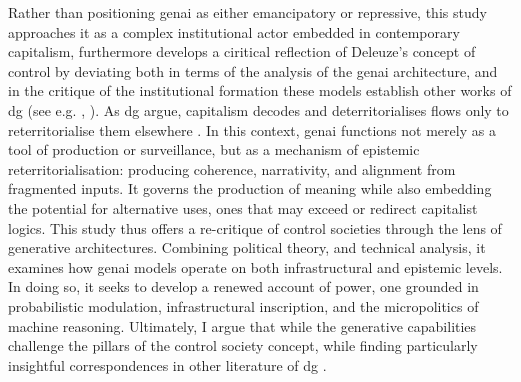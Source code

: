 Rather than positioning \gls{genai} as either emancipatory or repressive, this study approaches it as a complex institutional actor embedded in contemporary capitalism, furthermore develops a ciritical reflection of Deleuze's concept of control by deviating both in terms of the analysis of the \gls{genai} architecture, and in the critique of the institutional formation these models establish other works of \gls{dg}  (see e.g. \cite{deleuze1983}, \cite{deleuze1987}). As \gls{dg} argue, capitalism decodes and deterritorialises flows only to reterritorialise them elsewhere \parencite{deleuze1983}. In this context, \gls{genai} functions not merely as a tool of production or surveillance, but as a mechanism of epistemic reterritorialisation: producing coherence, narrativity, and alignment from fragmented inputs. It governs the production of meaning while also embedding the potential for alternative uses, ones that may exceed or redirect capitalist logics. This study thus offers a re-critique of control societies through the lens of generative architectures. Combining political theory, and technical analysis, it examines how \gls{genai} models operate on both infrastructural and epistemic levels. In doing so, it seeks to develop a renewed account of power, one grounded in probabilistic modulation, infrastructural inscription, and the micropolitics of machine reasoning. Ultimately, I argue that while the generative capabilities challenge the pillars of the control society concept, while finding particularly insightful correspondences in other literature of \gls{dg} .


